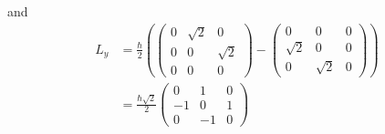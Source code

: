 \documentclass[11pt]{article}
\numberwithin{equation}{section}
\begin{document}
and
\begin{align*}
L_y &= \frac{\hbar}{2}\left(
   \left(\begin{array}{ccc}
         0    &\sqrt{2}   &0\\
         0    &0   &\sqrt{2}\\
         0    &0   &0
   \end{array}\right)
-  \left(\begin{array}{ccc}
         0    &0   &0 \\
         \sqrt{2}    &0   &0\\
         0    &\sqrt{2}   &0
         \end{array}\right)\right)\\
&= \frac{\hbar\sqrt{2}}{2}
   \left(\begin{array}{ccc}
         0    &1    &0\\
         -1   &0    &1\\
         0    &-1   &0
   \end{array}\right)
\end{align*}
\end{document}
